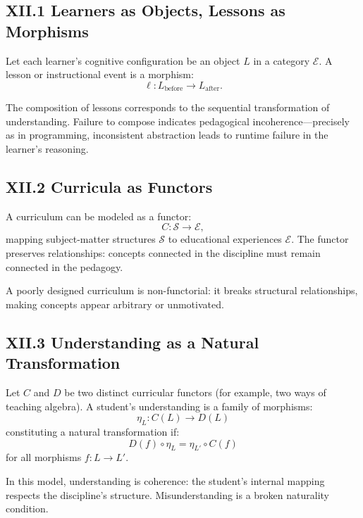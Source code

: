 \documentclass[12pt,letterpaper]{article}
\begin{document}
\subsection{XII.1 Learners as Objects, Lessons as Morphisms}

Let each learner’s cognitive configuration be an object \(L\) in a category \(\mathcal{E}\). A lesson or instructional event is a morphism:
\[
\ell : L_{\text{before}} \to L_{\text{after}}.
\]

The composition of lessons corresponds to the sequential transformation of understanding. Failure to compose indicates pedagogical incoherence—precisely as in programming, inconsistent abstraction leads to runtime failure in the learner’s reasoning.

\subsection{XII.2 Curricula as Functors}

A curriculum can be modeled as a functor:
\[
C: \mathcal{S} \to \mathcal{E},
\]
mapping subject-matter structures \(\mathcal{S}\) to educational experiences \(\mathcal{E}\). The functor preserves relationships: concepts connected in the discipline must remain connected in the pedagogy.

A poorly designed curriculum is non-functorial: it breaks structural relationships, making concepts appear arbitrary or unmotivated.

\subsection{XII.3 Understanding as a Natural Transformation}

Let \(C\) and \(D\) be two distinct curricular functors (for example, two ways of teaching algebra). A student’s understanding is a family of morphisms:
\[
\eta_L : C(L) \to D(L)
\]
constituting a natural transformation if:
\[
D(f) \circ \eta_L = \eta_{L'} \circ C(f)
\]
for all morphisms \(f: L \to L'\).

In this model, understanding is coherence: the student’s internal mapping respects the discipline’s structure. Misunderstanding is a broken naturality condition.
\end{document}
